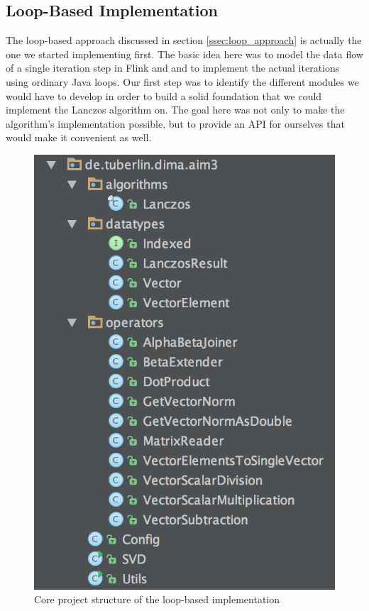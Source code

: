 
\subsection{Loop-Based Implementation}

The loop-based approach discussed in section \ref{ssec:loop_approach} is
actually the one we started implementing first. The basic idea here was to
model the data flow of a single iteration step in Flink and and to implement
the actual iterations using ordinary Java loops. Our first step was to identify
the different modules we would have to develop in order to build a solid
foundation that we could implement the Lanczos algorithm on. The goal here was
not only to make the algorithm's implementation possible, but to provide an API
for ourselves that would make it convenient as well.


\begin{figure}[h]
	\centering
	\includegraphics[scale=0.5]{images/loop_approach_project_structure}
    \caption{Core project structure of the loop-based implementation}
	\label{fig:loop_project_structure}
\end{figure}

